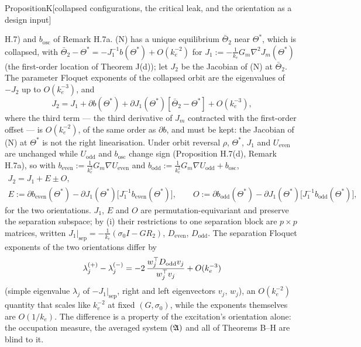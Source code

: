\begin{thm}{Proposition}{K}[collapsed configurations, the critical leak, and the orientation as a design input]
\begin{enumerate}[label=\textup{(\roman*)}]
    H.7\textup{)} and $b_{\mathrm{osc}}$ of Remark H.7a. \textup{(N)} has a unique equilibrium $\bar\Theta_2$ near
    $\Theta^*$, which is collapsed, with $\bar\Theta_2 - \Theta^* = -J_1^{-1}b(\Theta^*) + O(k_e^{-2})$ for
    $J_1 := -\frac1{k_e}G_m\nabla^2J_m(\Theta^*)$ \textup{(}the first-order location of Theorem J(d)\textup{)}; let
    $J_2$ be the Jacobian of \textup{(N)} at $\bar\Theta_2$. The parameter Floquet exponents of the collapsed orbit
    are the eigenvalues of $-J_2$ up to $O(k_e^{-3})$, and
    \[
      J_2 = J_1 + \partial b(\Theta^*) + \partial J_1(\Theta^*)[\bar\Theta_2 - \Theta^*] + O(k_e^{-3}),
    \]
    where the third term --- the third derivative of $J_m$ contracted with the first-order offset --- is $O(k_e^{-2})$,
    of the same order as $\partial b$, and must be kept: the Jacobian of \textup{(N)} at $\Theta^*$ is not the right
    linearisation. Under orbit reversal $\rho$, $\Theta^*$, $J_1$ and $U_{\mathrm{even}}$ are unchanged while
    $U_{\mathrm{odd}}$ and $b_{\mathrm{osc}}$ change sign \textup{(}Proposition H.7(d), Remark H.7a\textup{)}, so
    with $b_{\mathrm{even}} := \frac1{k_e^2}G_m\nabla U_{\mathrm{even}}$ and
    $b_{\mathrm{odd}} := \frac1{k_e^2}G_m\nabla U_{\mathrm{odd}} + b_{\mathrm{osc}}$,
    \begin{gather*}
      J_2 = J_1 + E \pm O,\\
      E := \partial b_{\mathrm{even}}(\Theta^*) - \partial J_1(\Theta^*)\bigl[J_1^{-1}b_{\mathrm{even}}(\Theta^*)\bigr],\qquad
      O := \partial b_{\mathrm{odd}}(\Theta^*) - \partial J_1(\Theta^*)\bigl[J_1^{-1}b_{\mathrm{odd}}(\Theta^*)\bigr],
    \end{gather*}
    for the two orientations. $J_1$, $E$ and $O$ are permutation-equivariant and preserve the separation subspace;
    by \textup{(i)} their restrictions to one separation block are $p\times p$ matrices, written
    $J_1|_{\mathrm{sep}} = -\frac1{k_e}(\sigma_0I - GR_2)$, $D_{\mathrm{even}}$, $D_{\mathrm{odd}}$. The separation
    Floquet exponents of the two orientations differ by
    \[
      \lambda_j^{(+)} - \lambda_j^{(-)} = -2\,\frac{w_j^\top D_{\mathrm{odd}}v_j}{w_j^\top v_j} + O(k_e^{-3})
    \]
    \textup{(}simple eigenvalue $\lambda_j$ of $-J_1|_{\mathrm{sep}}$, right and left eigenvectors $v_j$,
    $w_j$\textup{)}, an $O(k_e^{-2})$ quantity that scales like $k_e^{-2}$ at fixed $(G,\sigma_0)$, while the
    exponents themselves are $O(1/k_e)$. The difference is a property of the excitation's orientation alone: the
    occupation measure, the averaged system $(\mathfrak{A})$ and all of Theorems B--H are blind to it.

\end{enumerate}
\end{thm}
